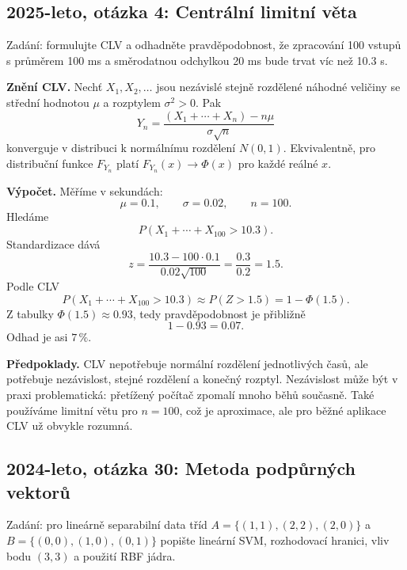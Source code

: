\subsection{2025-leto, otázka 4: Centrální limitní věta}

Zadání: formulujte CLV a odhadněte pravděpodobnost, že zpracování 100 vstupů s průměrem
100 ms a směrodatnou odchylkou 20 ms bude trvat víc než 10.3 s.

\begin{odpoved}
\textbf{Znění CLV.} Nechť $X_1,X_2,\ldots$ jsou nezávislé stejně rozdělené náhodné veličiny
se střední hodnotou $\mu$ a rozptylem $\sigma^2>0$. Pak
\[
Y_n=\frac{(X_1+\cdots+X_n)-n\mu}{\sigma\sqrt n}
\]
konverguje v distribuci k normálnímu rozdělení $N(0,1)$. Ekvivalentně, pro distribuční
funkce $F_{Y_n}$ platí $F_{Y_n}(x)\to\Phi(x)$ pro každé reálné $x$.

\textbf{Výpočet.} Měříme v sekundách:
\[
\mu=0.1,\qquad \sigma=0.02,\qquad n=100.
\]
Hledáme
\[
P(X_1+\cdots+X_{100}>10.3).
\]
Standardizace dává
\[
z=\frac{10.3-100\cdot0.1}{0.02\sqrt{100}}
=\frac{0.3}{0.2}=1.5.
\]
Podle CLV
\[
P(X_1+\cdots+X_{100}>10.3)\approx P(Z>1.5)=1-\Phi(1.5).
\]
Z tabulky $\Phi(1.5)\approx0.93$, tedy pravděpodobnost je přibližně
\[
1-0.93=0.07.
\]
Odhad je asi $7\,\%$.

\textbf{Předpoklady.} CLV nepotřebuje normální rozdělení jednotlivých časů, ale potřebuje
nezávislost, stejné rozdělení a konečný rozptyl. Nezávislost může být v praxi problematická:
přetížený počítač zpomalí mnoho běhů současně. Také používáme limitní větu pro $n=100$,
což je aproximace, ale pro běžné aplikace CLV už obvykle rozumná.
\end{odpoved}

\subsection{2024-leto, otázka 30: Metoda podpůrných vektorů}

Zadání: pro lineárně separabilní data tříd $A=\{(1,1),(2,2),(2,0)\}$ a
$B=\{(0,0),(1,0),(0,1)\}$ popište lineární SVM, rozhodovací hranici, vliv bodu $(3,3)$
a použití RBF jádra.

